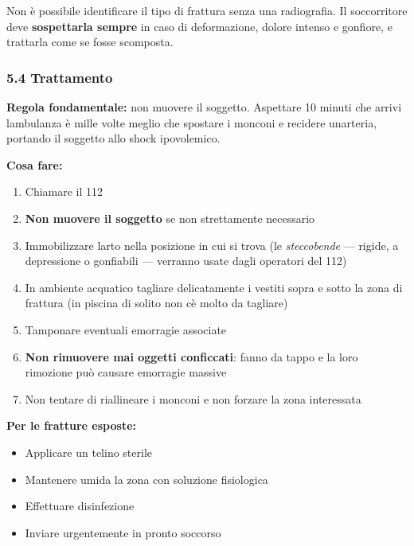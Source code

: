 \documentclass[a4paper,11pt]{article}
\providecommand{\tightlist}{%
  \setlength{\itemsep}{0pt}\setlength{\parskip}{0pt}}
\begin{document}
Non è possibile identificare il tipo di frattura senza una radiografia.
Il soccorritore deve \textbf{sospettarla sempre} in caso di
deformazione, dolore intenso e gonfiore, e trattarla come se fosse
scomposta.

\subsubsection{5.4 Trattamento}\label{trattamento}

\textbf{Regola fondamentale:} non muovere il soggetto. Aspettare 10
minuti che arrivi l\textquotesingle ambulanza è mille volte meglio che
spostare i monconi e recidere un\textquotesingle arteria, portando il
soggetto allo shock ipovolemico.

\textbf{Cosa fare:}

\begin{enumerate}
      \tightlist
      \item
            Chiamare il 112
      \item
            \textbf{Non muovere il soggetto} se non strettamente necessario
      \item
            Immobilizzare l\textquotesingle arto nella posizione in cui si trova
            (le \emph{steccobende} --- rigide, a depressione o gonfiabili ---
            verranno usate dagli operatori del 112)
      \item
            In ambiente acquatico tagliare delicatamente i vestiti sopra e sotto
            la zona di frattura (in piscina di solito non c\textquotesingle è
            molto da tagliare)
      \item
            Tamponare eventuali emorragie associate
      \item
            \textbf{Non rimuovere mai oggetti conficcati}: fanno da tappo e la
            loro rimozione può causare emorragie massive
      \item
            Non tentare di riallineare i monconi e non forzare la zona interessata
\end{enumerate}

\textbf{Per le fratture esposte:}

\begin{itemize}
      \tightlist
      \item
            Applicare un telino sterile
      \item
            Mantenere umida la zona con soluzione fisiologica
      \item
            Effettuare disinfezione
      \item
            Inviare urgentemente in pronto soccorso
\end{itemize}
\end{document}
